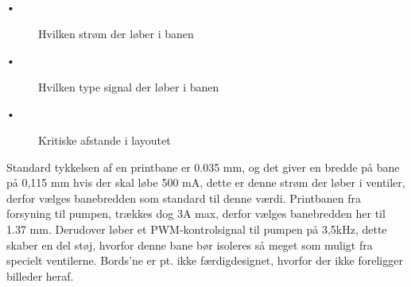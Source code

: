 \begin{description}
 \item[•] Hvilken strøm der løber i banen
 \item[•] Hvilken type signal der løber i banen
 \item[•] Kritiske afstande i layoutet
\end{description}

Standard tykkelsen af en printbane er 0.035 mm, og det giver en bredde på bane på 0,115 mm hvis der skal løbe 500 mA, dette er denne strøm der løber i ventiler, derfor vælges banebredden som standard til denne værdi. 
Printbanen fra forsyning til pumpen, trækkes dog 3A max, derfor vælges banebredden her til 1.37 mm. \newline
Derudover løber et PWM-kontrolsignal til pumpen på 3,5kHz, dette skaber en del støj, hvorfor denne bane bør isoleres så meget som muligt fra specielt ventilerne.\newline
Bords'ne er pt. ikke færdigdesignet, hvorfor der ikke foreligger billeder heraf. 
 